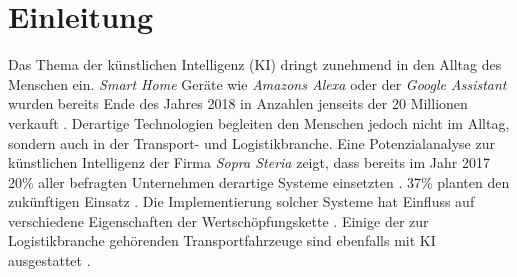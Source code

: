 
\chapter{Einleitung}
\label{ch: Einleitung}
	

		Das Thema der künstlichen Intelligenz (KI) dringt zunehmend in den Alltag des Menschen ein. \textit{Smart Home} Geräte wie \textit{Amazons Alexa} oder der \textit{Google Assistant} wurden bereits Ende des Jahres 2018 in Anzahlen jenseits der 20 Millionen verkauft \cite{smart}. Derartige Technologien begleiten den Menschen jedoch nicht im Alltag, sondern auch in der Transport- und Logistikbranche. Eine Potenzialanalyse zur künstlichen Intelligenz der Firma \textit{Sopra Steria} zeigt, dass bereits im Jahr 2017 20\% aller befragten Unternehmen derartige Systeme einsetzten \cite{sopra}. 37\% planten den zukünftigen Einsatz \cite{sopra}. Die Implementierung solcher Systeme hat Einfluss auf verschiedene Eigenschaften der Wertschöpfungskette \cite{sopra}. Einige der zur Logistikbranche gehörenden Transportfahrzeuge sind ebenfalls mit KI ausgestattet \cite{sopra}.\\
		
